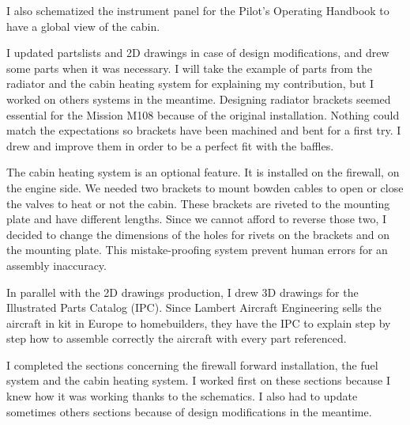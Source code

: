 \documentclass[11pt,a4paper]{report}
\begin{document}

\bigskip

I also schematized the instrument panel for the Pilot's Operating Handbook to have a global view of the cabin.

\bigskip

I updated partslists and 2D drawings in case of design modifications, and drew some parts when it was necessary. I will take the example of parts from the radiator and the cabin heating system for explaining my contribution, but I worked on others systems in the meantime.
Designing radiator brackets seemed essential for the Mission M108 because of the original installation. Nothing could match the expectations so brackets have been machined and bent for a first try. I drew and improve them in order to be a perfect fit with the baffles.

\bigskip

The cabin heating system is an optional feature. It is installed on the firewall, on the engine side. We needed two brackets to mount bowden cables to open or close the valves to heat or not the cabin. These brackets are riveted to the mounting plate and have different lengths. Since we cannot afford to reverse those two, I decided to change the dimensions of the holes for rivets on the brackets and on the mounting plate. This mistake-proofing system prevent human errors for an assembly inaccuracy.

\bigskip

In parallel with the 2D drawings production, I drew 3D drawings for the Illustrated Parts Catalog (IPC). Since Lambert Aircraft Engineering sells the aircraft in kit in Europe to homebuilders, they have the IPC to explain step by step how to assemble correctly the aircraft with every part referenced.

\bigskip

I completed the sections concerning the firewall forward installation, the fuel system and the cabin heating system. I worked first on these sections because I knew how it was working thanks to the schematics. I also had to update sometimes others sections because of design modifications in the meantime.

\bigskip
\end{document}
